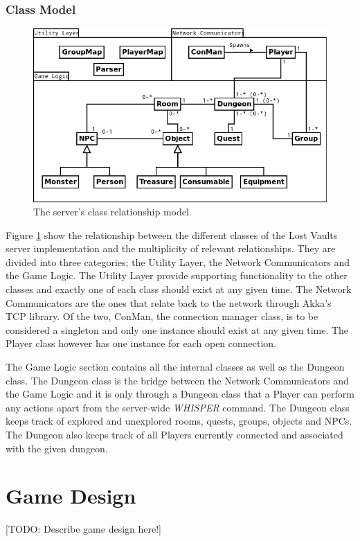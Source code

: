 \documentclass[a4paper]{article}
\begin{document}
\subsubsection{Class Model}
\begin{figure}[ht]
\centering
\includegraphics[width=1.0\textwidth]{serveruml1}
\caption{\label{fig:ServerUML}The server's class relationship model.}
\end{figure}
Figure \ref{fig:ServerUML} show the relationship between the different classes of the Lost Vaults server implementation and the multiplicity of relevant relationships. They are divided 
into three categories; the Utility Layer, the Network Communicators and the Game Logic. The Utility Layer provide supporting functionality to the other classes and exactly one of each 
class should exist at any given time. The Network Communicators are the ones that relate back to the network through Akka's TCP library. Of the two, ConMan, the connection manager class, 
is to be considered a singleton and only one instance should exist at any given time. The Player class however has one instance for each open connection.

The Game Logic section contains all the internal classes as well as the Dungeon class. The Dungeon class is the bridge between the Network Communicators and the Game Logic and it is 
only through a Dungeon class that a Player can perform any actions apart from the server-wide \textit{WHISPER} command. The Dungeon class keeps track of explored and unexplored rooms, 
quests, groups, objects and NPCs. The Dungeon also keeps track of all Players currently connected and associated with the given dungeon.
\section{Game Design}
[TODO: Describe game design here!]
\end{document}
